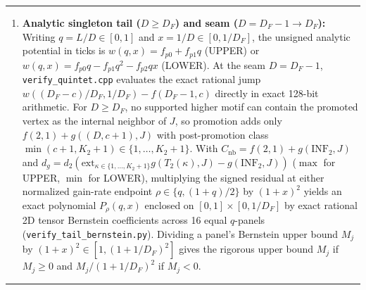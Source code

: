 \documentclass[11pt]{article}
\theoremstyle{remark}
\numberwithin{equation}{section}
\newenvironment{transcription}{\par\medskip\noindent\rule{\linewidth}{0.4pt}\par\nopagebreak}{\par\nopagebreak\noindent\rule{\linewidth}{0.4pt}\par\medskip}
\begin{document}
\begin{transcription}
\begin{enumerate}
\begin{itemize}
\item \textbf{Double-tail and \texttt{INF} corners in $g(u, v)$:} Only $g(u, v)$ has two adjacent endpoints that can simultaneously be physical tails ($D_u, D_v \ge d_2$, with $t_u = d_2/D_u, t_v = d_2/D_v$). Expanding $g(u, v)$ over $\mu_u^{(2)} \otimes \mu_v^{(2)}$ and using $g(\mathrm{INF}_2, \mathrm{INF}_2) = 0$: the $(\mathrm{INF}_2, \mathrm{INF}_2)$ corner carries zero value, zero incoming transfers, and zero residual; on $(\mathrm{INF}_2, y)$ with $y$ inner, $y$ still evolves under its own leaves and external neighbors while $u$'s credit $\iota_u$ is already accounted for in $(T_u, y)$. When both $u$ and $v$ have $D_u, D_v \ge d_2$, the cross-donor rates $\iota_v$ and $\iota_u$ are \textbf{not} dropped: they are fully contained inside $r_u$ and $r_v$ (hence inside $\gamma_u, \gamma_v \in [(d_2 - \kappa)/(d_2 + 1), 1]$ for exact classes $\kappa \le K_2$ --- taking $\iota_{\mathrm{nbr,lo}} = 0$ since $\iota > 0$ --- and inside $[0, 1]$ for overflow class $\kappa = K_2 + 1$), and averaging $t_u \gamma_u (g(\mathrm{INF}_2, \cdot) - g(T_u, \cdot))$ over $\mu_v^{(2)}$ assigns exact weights $t_u t_v$ to row $(T_u, T_v)$ and $t_u(1 - t_v)$ to row $(T_u, \mathrm{INF}_2)$ (and symmetrically for $v$).

\end{itemize}
\item \textbf{Analytic singleton tail ($D \ge D_F$) and seam ($D = D_F - 1 \to D_F$):}
   Writing $q = L/D \in [0, 1]$ and $x = 1/D \in [0, 1/D_F]$, the unsigned analytic potential in ticks is $w(q, x) = f_{p0} + f_{p1} q$ (UPPER) or $w(q, x) = f_{p0} q - f_{p1} q^2 - f_{p2} q x$ (LOWER). At the seam $D = D_F - 1$, \texttt{verify\_quintet.cpp} evaluates the exact rational jump $w((D_F - c)/D_F, 1/D_F) - f(D_F - 1, c)$ directly in exact 128-bit arithmetic. For $D \ge D_F$, no supported higher motif can contain the promoted vertex as the internal neighbor of $J$, so promotion adds only $f(2,1) + g((D, c+1), J)$ with post-promotion class $\min(c+1, K_2+1) \in \{1, \dots, K_2+1\}$. With $C_{\mathrm{nb}} = f(2,1) + g(\mathrm{INF}_2, J)$ and $d_g = d_2(\mathrm{ext}_{\kappa \in \{1,\dots,K_2+1\}} g(T_2(\kappa), J) - g(\mathrm{INF}_2, J))$ ($\max$ for UPPER, $\min$ for LOWER), multiplying the signed residual at either normalized gain-rate endpoint $\rho \in \{q, (1+q)/2\}$ by $(1+x)^2$ yields an exact polynomial $P_\rho(q, x)$ enclosed on $[0, 1] \times [0, 1/D_F]$ by exact rational 2D tensor Bernstein coefficients across 16 equal $q$-panels (\texttt{verify\_tail\_bernstein.py}). Dividing a panel's Bernstein upper bound $M_j$ by $(1+x)^2 \in [1, (1 + 1/D_F)^2]$ gives the rigorous upper bound $M_j$ if $M_j \ge 0$ and $M_j / (1 + 1/D_F)^2$ if $M_j < 0$.
\end{enumerate}



\end{transcription}
\end{document}
